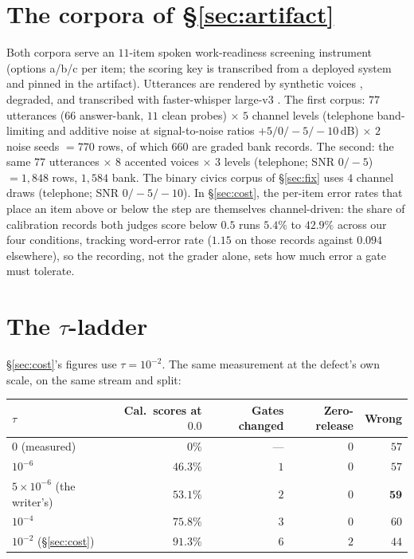 \documentclass{article}
\newif\ifclaimtags\claimtagsfalse
\newcommand{\ct}[1]{\ifclaimtags\hfill{\scriptsize\textcolor{gray}{[#1]}}\fi}
\begin{document}
\section{The corpora of \S\ref{sec:artifact}}\label{app:corpora}
Both corpora serve an $11$-item spoken work-readiness screening instrument
(options a/b/c per item; the scoring key is transcribed from a deployed system
and pinned in the artifact). Utterances are rendered by synthetic voices
\citep{edgetts}, degraded, and transcribed with faster-whisper large-v3
\citep{fasterwhisper}. The first corpus: $77$ utterances ($66$ answer-bank,
$11$ clean probes) $\times$ $5$ channel levels (telephone band-limiting and additive noise at
signal-to-noise ratios $+5/0/-5/-10$\,dB) $\times$ $2$ noise seeds $= 770$ rows, of which $660$ are graded bank records. The second: the same
$77$ utterances $\times$ $8$ accented voices $\times$ $3$ levels (telephone;
SNR $0/-5$) $= 1{,}848$ rows, $1{,}584$ bank. The binary civics corpus of
\S\ref{sec:fix} uses $4$ channel draws (telephone; SNR $0/-5/-10$).\ct{C83} In \S\ref{sec:cost}, the per-item error rates that place an item above or below the step are themselves channel-driven: the share of calibration records both judges score below $0.5$ runs
$5.4\%$ to $42.9\%$ across our four conditions, tracking word-error rate
($1.15$ on those records against $0.094$ elsewhere), so the recording, not the grader alone, sets how much error a gate must tolerate.\ct{C21, C22}

\section{The $\tau$-ladder}\label{app:ladder}
\S\ref{sec:cost}'s figures use $\tau = 10^{-2}$. The same measurement at the
defect's own scale, on the same stream and split:

\label{tab:ladder}
\begin{center}\small
\begin{tabular}{lrrrr}
\toprule
$\tau$ & Cal.\ scores at $0.0$ & Gates changed & Zero-release & Wrong \\
\midrule
$0$ (measured) & $0\%$ & --- & $0$ & $57$ \\
$10^{-6}$ & $46.3\%$ & $1$ & $0$ & $57$ \\
$5\times10^{-6}$ (the writer's) & $53.1\%$ & $2$ & $0$ & $\mathbf{59}$ \\
$10^{-4}$ & $75.8\%$ & $3$ & $0$ & $60$ \\
$10^{-2}$ (\S\ref{sec:cost}) & $91.3\%$ & $6$ & $2$ & $44$ \\
\bottomrule
\end{tabular}
\end{center}
\end{document}
